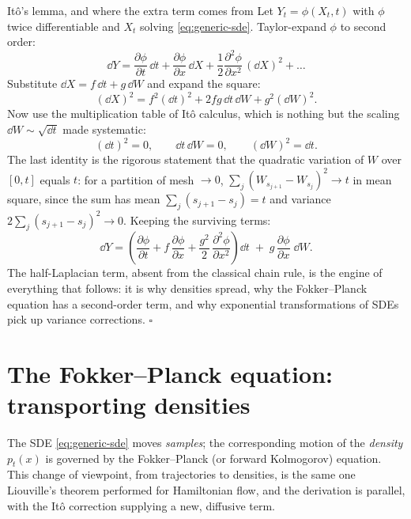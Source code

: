\begin{toolbox}{It\^o's lemma, and where the extra term comes from}
Let $Y_t = \phi(X_t, t)$ with $\phi$ twice differentiable and $X_t$
solving \eqref{eq:generic-sde}. Taylor-expand $\phi$ to second order:
\begin{equation*}
  \dd Y
  = \frac{\partial \phi}{\partial t}\,\dd t
  + \frac{\partial \phi}{\partial x}\,\dd X
  + \frac{1}{2} \frac{\partial^2 \phi}{\partial x^2}\,(\dd X)^2
  + \dots
\end{equation*}
Substitute $\dd X = f\,\dd t + g\,\dd W$ and expand the square:
\begin{equation*}
  (\dd X)^2 = f^2 (\dd t)^2 + 2 f g\, \dd t\, \dd W + g^2 (\dd W)^2 .
\end{equation*}
Now use the multiplication table of It\^o calculus, which is nothing but
the scaling $\dd W \sim \sqrt{\dd t}$ made systematic:
\begin{equation*}
  (\dd t)^2 = 0, \qquad \dd t\, \dd W = 0, \qquad (\dd W)^2 = \dd t .
\end{equation*}
The last identity is the rigorous statement that the quadratic variation
of $W$ over $[0,t]$ equals $t$: for a partition of mesh $\to 0$,
$\sum_j (W_{s_{j+1}} - W_{s_j})^2 \to t$ in mean square, since the sum
has mean $\sum_j (s_{j+1} - s_j) = t$ and variance
$2\sum_j (s_{j+1}-s_j)^2 \to 0$. Keeping the surviving terms:
\begin{equation*}
  \dd Y = \left(
    \frac{\partial \phi}{\partial t}
    + f\,\frac{\partial \phi}{\partial x}
    + \frac{g^2}{2}\,\frac{\partial^2 \phi}{\partial x^2}
  \right) \dd t
  \;+\; g\,\frac{\partial \phi}{\partial x}\; \dd W .
\end{equation*}
The half-Laplacian term, absent from the classical chain rule, is the
engine of everything that follows: it is why densities spread, why the
Fokker--Planck equation has a second-order term, and why exponential
transformations of SDEs pick up variance corrections. \hfill$\square$
\end{toolbox}

\section{The Fokker--Planck equation: transporting densities}
\label{sec:fokker-planck}

The SDE \eqref{eq:generic-sde} moves \emph{samples}; the corresponding
motion of the \emph{density} $p_t(x)$ is governed by the Fokker--Planck
(or forward Kolmogorov) equation. This change of viewpoint, from
trajectories to densities, is the same one Liouville's theorem performed
for Hamiltonian flow, and the derivation is parallel, with the It\^o
correction supplying a new, diffusive term.

